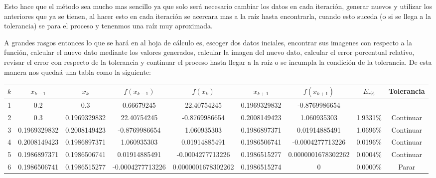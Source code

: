 \documentclass{article}
\begin{document}
Esto hace que el método sea mucho mas sencillo ya que solo será necesario cambiar los datos en cada iteración, generar nuevos 
y utilizar los anteriores que ya se tienen, al hacer esto en cada iteración se acercara mas a la raíz hasta encontrarla, cuando 
esto suceda (o si se llega a la tolerancia) se para el proceso y tenenmos una raíz muy aproximada. 

A grandes rasgos entonces lo que se hará en al hoja de cálculo es, escoger dos datos inciales, encontrar sus imagenes con 
respecto a la función, calcular el nuevo dato mediante los valores generados, calcular la imagen del nuevo dato, calcular 
el error porcentual relativo, revisar el error con respecto de la tolerancia y continuar el proceso hasta llegar a la raíz 
o se incumpla la condición de la tolerancia. De esta manera nos quedaá una tabla como la siguiente:

\begin{table}[h]
    \begin{center}
        \resizebox{16cm}{!} {
        \begin{tabular}{| c | c | c | c | c | c | c | c | c |}
            \hline
            $k$ & $x_{k-1}$ & $x_k$ & $f(x_{k-1})$ &$f(x_k)$ & $x_{k+1}$& $f(x_{k+1})$ & $E_{r\%}$ & Tolerancia \\ \hline
               1 & 0.2&0.3 & 0.66679245&22.40754245 &0.1969329832 &-0.8769986654& & \\ \hline
               2 & 0.3& 0.1969329832& 22.40754245& -0.8769986654& 0.2008149423&1.060935303 & 1.9331\%&Continuar \\ \hline
               3 &0.1969329832 &0.2008149423 &-0.8769986654 &1.060935303 &0.1986897371 &0.01914885491 & 1.0696\%&Continuar \\ \hline
               4 &0.2008149423 & 0.1986897371&1.060935303 &0.01914885491 & 0.1986506741&-0.0004277713226 &0.0196\% & Continuar\\ \hline
               5 &0.1986897371 & 0.1986506741& 0.01914885491&-0.0004277713226 &0.1986515277 &0.0000001678302262 &0.0004\% & Continuar\\ \hline
               6 &0.1986506741 &0.1986515277 &-0.0004277713226 &0.0000001678302262 &0.1986515274 &0 & 0.0000\%&Parar \\ \hline
        \end{tabular}
        }
    \end{center}
    
\end{table}
\end{document}

